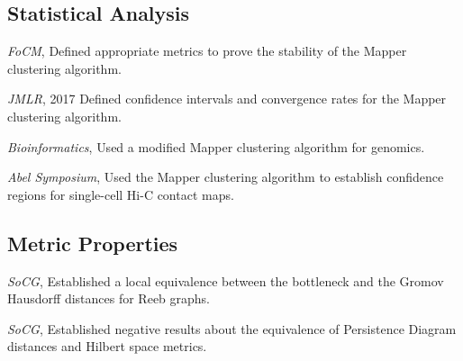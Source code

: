 \documentclass[11pt,a4paper]{moderncv}
\begin{document}
	\subsection{Statistical Analysis}

                          {\textit{FoCM}, }
                          {}{}{\footnotesize Defined appropriate metrics to prove the stability of the Mapper clustering algorithm.}


                          {\small\textit{JMLR}, 2017}
                          {}{}{\footnotesize Defined confidence intervals and convergence rates for the Mapper clustering algorithm.}

                          {\small\textit{Bioinformatics}, }
                          {}{}{\footnotesize Used a modified Mapper clustering algorithm for genomics.}

                          {\small\textit{Abel Symposium}, }
                          {}{}{\footnotesize Used the Mapper clustering algorithm to establish confidence regions for single-cell Hi-C contact maps.}

		
	\subsection{Metric Properties}


                          {\small\textit{SoCG}, }
                          {}{}{\footnotesize Established a local equivalence between the bottleneck and the Gromov Hausdorff distances for Reeb graphs.}		

                          {\small\textit{SoCG}, }
                          {}{}{\footnotesize Established negative results about the equivalence of Persistence Diagram distances and Hilbert space metrics.}			
		
\end{document}
